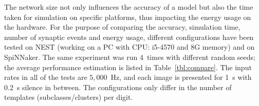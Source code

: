 \documentclass{frontiersENG} %
\begin{document}
The network size not only influences the accuracy of a model but also the time taken for simulation on specific platforms, thus impacting the energy usage on the hardware.
For the purpose of comparing the accuracy, simulation time, number of synaptic events and energy usage, different configurations have been tested on NEST (working on a PC with CPU: i5-4570 and 8G memory) and on SpiNNaker.
The same experiment was run 4~times with different random seeds; the average performance estimation is listed in Table~\ref{tbl:compare}.
The input rates in all of the tests are $5,000$~Hz, and each image is presented for 1~s with 0.2~s silence in between.
The configurations only differ in the number of templates (subclasses/clusters) per digit.
\end{document}
